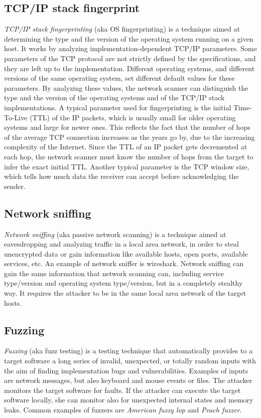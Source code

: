 \documentclass[a4paper,12pt]{article}
\begin{document}
\subsection{TCP/IP stack fingerprint}
\textit{TCP/IP stack fingerprinting} (aka OS fingerprinting) is a technique aimed at determining the type and the version of the operating system running on a given host. It works by analyzing implementation-dependent TCP/IP parameters. Some parameters of the TCP protocol are not strictly defined by the specifications, and they are left up to the implementation. Different operating systems, and different versions of the same operating system, set different default values for these parameters. By analyzing these values, the network scanner can distinguish the type and the version of the operating systems and of the TCP/IP stack implementations. A typical parameter used for fingerprinting is the initial Time-To-Live (TTL) of the IP packets, which is usually small for older operating systems and large for newer ones. This reflects the fact that the number of hops of the average TCP connection increases as the years go by, due to the increasing complexity of the Internet. Since the TTL of an IP packet gets decremented at each hop, the network scanner must know the number of hops from the target to infer the exact initial TTL. Another typical parameter is the TCP window size, which tells how much data the receiver can accept before acknowledging the sender.

\subsection{Network sniffing}
\textit{Network sniffing} (aka passive network scanning) is a technique aimed at eavesdropping and analyzing traffic in a local area network, in order to steal unencrypted data or gain information like available hosts, open ports, available services, etc. An example of network sniffer is wireshark. Network sniffing can gain the same information that network scanning can, including service type/version and operating system type/version, but in a completely stealthy way. It requires the attacker to be in the same local area network of the target hosts.

\subsection{Fuzzing}
\textit{Fuzzing} (aka fuzz testing) is a testing technique that automatically provides to a target software a long series of invalid, unexpected, or totally random inputs with the aim of finding implementation bugs and vulnerabilities. Examples of inputs are network messages, but also keyboard and mouse events or files. The attacker monitors the target software for faults. If the attacker can execute the target software locally, she can monitor also for unexpected internal states and memory leaks. Common examples of fuzzers are \textit{American fuzzy lop} and \textit{Peach fuzzer}.
\end{document}
